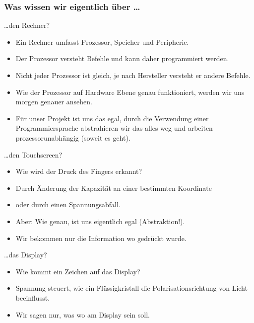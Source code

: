 \begin{frame}
	\frametitle{Was wissen wir eigentlich über \ldots}


	\begin{block}{\ldots den Rechner?}
		\begin{itemize}
			\item Ein Rechner umfasst Prozessor, Speicher und Peripherie.
			\item Der Prozessor versteht Befehle und kann daher programmiert werden.
			\item Nicht jeder Prozessor ist gleich, je nach Hersteller versteht er
				andere Befehle.
			\item Wie der Prozessor auf Hardware Ebene genau funktioniert, werden
				wir uns morgen genauer ansehen.
			\item Für unser Projekt ist uns das egal, durch die Verwendung
				einer \alert<2->{Programmiersprache} abstrahieren wir das
				alles weg und \alert<2->{arbeiten prozessorunabhängig} (soweit
				es geht).

		\end{itemize}
	\end{block}
\end{frame}

\begin{frame}

	\begin{block}{\ldots den Touchscreen?}
		\begin{itemize}
			\item Wie wird der Druck des Fingers erkannt?
			\item Durch Änderung der Kapazität an einer bestimmten Koordinate
			\item oder durch einen Spannungsabfall.

			\item Aber: Wie genau, ist uns eigentlich egal (Abstraktion!).
			\item \alert<2->{Wir bekommen nur die Information wo gedrückt wurde.}
		\end{itemize}
	\end{block}
\end{frame}

\begin{frame}
	\begin{block}{\ldots das Display?}
		\begin{itemize}
			\item Wie kommt ein Zeichen auf das Display?
			\item Spannung steuert, wie ein Flüssigkristall die Polarisationsrichtung von Licht beeinflusst.
			\item \alert<2->{Wir sagen nur, was wo am Display sein soll.}
		\end{itemize}
	\end{block}
\end{frame}


